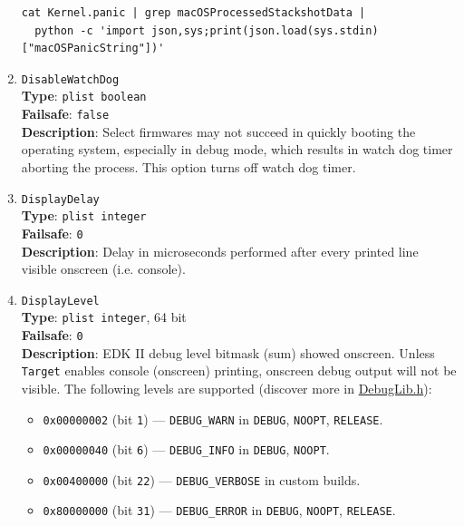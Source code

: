 \documentclass[]{article}
\providecommand{\tightlist}{%
  \setlength{\itemsep}{0pt}\setlength{\parskip}{0pt}}
\begin{document}
\begin{enumerate}
\begin{lstlisting}[label=kpanic, style=ocbash]
cat Kernel.panic | grep macOSProcessedStackshotData |
  python -c 'import json,sys;print(json.load(sys.stdin)["macOSPanicString"])'
\end{lstlisting}

\item
  \texttt{DisableWatchDog}\\
  \textbf{Type}: \texttt{plist\ boolean}\\
  \textbf{Failsafe}: \texttt{false}\\
  \textbf{Description}: Select firmwares may not succeed in quickly booting
  the operating system, especially in debug mode, which results in watch dog
  timer aborting the process. This option turns off watch dog timer.

\item
  \texttt{DisplayDelay}\\
  \textbf{Type}: \texttt{plist\ integer}\\
  \textbf{Failsafe}: \texttt{0}\\
  \textbf{Description}: Delay in microseconds performed after
  every printed line visible onscreen (i.e. console).

\item
  \texttt{DisplayLevel}\\
  \textbf{Type}: \texttt{plist\ integer}, 64 bit\\
  \textbf{Failsafe}: \texttt{0}\\
  \textbf{Description}: EDK II debug level bitmask (sum) showed onscreen.
  Unless \texttt{Target} enables console (onscreen) printing,
  onscreen debug output will not be visible. The following levels
  are supported (discover more in
  \href{https://github.com/acidanthera/audk/blob/master/MdePkg/Include/Library/DebugLib.h}{DebugLib.h}):

  \begin{itemize}
  \tightlist
    \item \texttt{0x00000002} (bit \texttt{1}) --- \texttt{DEBUG\_WARN} in \texttt{DEBUG},
      \texttt{NOOPT}, \texttt{RELEASE}.
    \item \texttt{0x00000040} (bit \texttt{6}) --- \texttt{DEBUG\_INFO} in \texttt{DEBUG},
      \texttt{NOOPT}.
    \item \texttt{0x00400000} (bit \texttt{22}) --- \texttt{DEBUG\_VERBOSE} in custom builds.
    \item \texttt{0x80000000} (bit \texttt{31}) --- \texttt{DEBUG\_ERROR} in \texttt{DEBUG},
      \texttt{NOOPT}, \texttt{RELEASE}.
  \end{itemize}


\end{enumerate}
\end{document}
